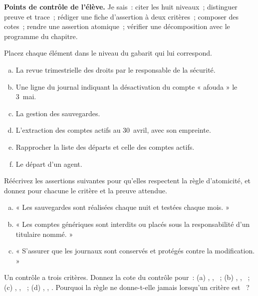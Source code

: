 \begin{boxinfo}
\textbf{Points de contrôle de l'élève.} Je sais~: citer les huit
niveaux~; distinguer preuve et trace~; rédiger une fiche d'assertion à deux
critères~; composer des cotes~; rendre une assertion atomique~; vérifier
une décomposition avec le programme du chapitre.
\end{boxinfo}

\bigskip

\begin{boxexo}[title={\ding{45}\quad Exercice~9.1. À quel niveau~? \niveaubase}]
Placez chaque élément dans le niveau du gabarit qui lui correspond.
\begin{enumerate}[(a)]
    \item La revue trimestrielle des droits par le responsable de la
          sécurité.
    \item Une ligne du journal indiquant la désactivation du compte
          « afouda » le 3~mai.
    \item La gestion des sauvegardes.
    \item L'extraction des comptes actifs au 30~avril, avec son empreinte.
    \item Rapprocher la liste des départs et celle des comptes actifs.
    \item Le départ d'un agent.
\end{enumerate}
\end{boxexo}

\begin{boxexo}[title={\ding{45}\quad Exercice~9.2. Rendre atomique \niveaubase}]
Réécrivez les assertions suivantes pour qu'elles respectent la règle
d'atomicité, et donnez pour chacune le critère et la preuve attendue.
\begin{enumerate}[(a)]
    \item « Les sauvegardes sont réalisées chaque nuit et testées chaque
          mois. »
    \item « Les comptes génériques sont interdits ou placés sous la
          responsabilité d'un titulaire nommé. »
    \item « S'assurer que les journaux sont conservés et protégés contre la
          modification. »
\end{enumerate}
\end{boxexo}

\begin{boxexo}[title={\ding{45}\quad Exercice~9.3. Composer des cotes \niveaubase}]
Un contrôle a trois critères. Donnez la cote du contrôle pour~: (a)
\OUI{}, \OUI{}, \NEK{}~; (b) \NEK{}, \NON{}, \OUI{}~; (c) \NEK{}, \NEK{},
\NEK{}~; (d) \OUI{}, \OUI{}, \OUI{}. Pourquoi la règle ne donne-t-elle
jamais \OUI{} lorsqu'un critère est \NEK{}~?
\end{boxexo}

